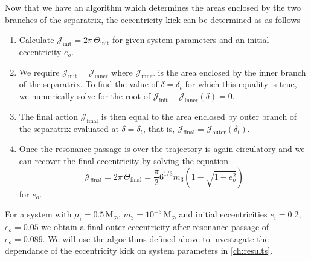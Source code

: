 Now that we have an algorithm which determines the areas enclosed by the two
branches of the separatrix, the eccentricity kick can be determined as
as follows
\begin{enumerate}
    \item Calculate $\mathcal{J}_\text{init}=2\pi\,\Theta_\text{init}$ for given
        system parameters and an initial eccentricity $e_o$.\\
    \item We require $\mathcal{J}_\text{init}=\mathcal{J}_\text{inner}$ 
        where $\mathcal{J}_\text{inner}$ is the area enclosed by the inner
        branch of the separatrix. To find the value of $\delta=\delta_t$ for
        which this equality is true, we numerically solve for the root of
        $\mathcal{J}_\text{init}-\mathcal{J}_\text{inner}(\delta)=0$.
    \item The final action $\mathcal{J}_\text{final}$ is then equal to
        the area enclosed by outer branch of the separatrix evaluated at
        $\delta=\delta_t$, that is, $\mathcal{J}_\text{final}=
        \mathcal{J}_\text{outer}(\delta_t)$.
    \item Once the resonance passage is over the trajectory is again circulatory
        and we can recover the final eccentricity by solving the equation
        \begin{equation}
            \mathcal{J}_\text{final}=2\pi\,\Theta_\text{final}=
            \frac{\pi}{2} 6^{1/3}m_3\left(1-\sqrt{1-e_o^2}\right)
        \end{equation}
        for $e_o$. 
\end{enumerate}
For a system with $\mu_i=0.5\,\text{M}_\odot$, $m_3=10^{-3}\,\text{M}_\odot$ 
and initial eccentricities $e_i=0.2$, $e_o=0.05$ we obtain a final outer
eccentricity after resonance passage of $e_o=0.089$. We will use the
algorithms defined above to investagate the dependance of the eccentricity
kick on system parameters in \cref{ch:results}.
